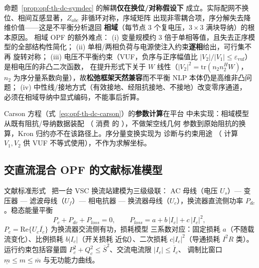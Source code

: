 \begin{remark}\label{rem:opf-th-dc-unbalanced}
命题~\ref{prop:opf-th-dc-symdec} 的解耦\textbf{仅在换位/对称假设下}
成立。实际配网不换位、相间互感显著，$Z_{abc}$ 非循环对称，序域矩阵
出现非零耦合项，序分解失去降维价值——这是不平衡分析退回
\textbf{相域}（每节点 $3$ 个复电压，$3\times3$ 满块导纳）的根本原因。
相域 OPF 的额外难点：
(i) 变量规模约 $3$ 倍于单相等值，且失去正序模型的全部结构性简化；
(ii) 单相/两相负荷与电源使注入约束\textbf{逐相}给出，可行集不再
旋转对称；
(iii) 电压不平衡约束（VUF，负序与正序幅值比
$|V_2|/|V_1|\le\varepsilon_{\mathrm{vuf}}$）是相电压的非凸二次函数，
在提升形式下关于 $W$ 线性（$|V_2|^2=\mathrm{tr}(n_2n_2^{H}W)$，
$n_2$ 为序分量系数向量），故\textbf{松弛框架天然兼容}而不平衡 NLP
本体仍是高维非凸问题；
(iv) 中性线/接地方式（有效接地、经阻抗接地、不接地）改变零序通道，
必须在相域导纳中显式编码，不能事后折算。
\end{remark}

\begin{gapnote}
Carson 方程（式~\eqref{eq:opf-th-dc-carson}）的\textbf{参数计算}在平台
中未实现：相域模型从既有阻抗/导纳数据装配
（
消费  的 ），不做架空线几何
参数到原始阻抗的换算，Kron 归约亦不在该路径上。序分量变换实现为
诊断与约束用途
（
计算 $V_1,V_2$ 供 VUF 不等式使用），不作为求解坐标。
\end{gapnote}

\subsection{交直流混合 OPF 的文献标准模型}\label{sec:opf-th-dc-hybrid}

\begin{definition}\label{def:opf-th-dc-vsc}
文献标准形式~\cite{opfdc:beerten} 把一台 VSC 换流站建模为三级级联：
AC 母线（电压 $U_s$）— 变压器 — 滤波母线（$U_f$）— 相电抗器 —
换流器母线（$U_c$），换流器直流侧功率 $P_{dc}$。稳态能量平衡
\begin{equation}
P_c+P_{dc}+P_{loss}=0,\qquad
P_{loss}=a+b\,|I_c|+c\,|I_c|^2,
\label{eq:opf-th-dc-vscloss}
\end{equation}
$P_c=\mathrm{Re}\{U_c\overline{I_c}\}$ 为换流器交流侧有功，损耗模型
三系数对应：固定损耗 $a$（不随载流变化）、比例损耗 $b|I_c|$（开关损耗
近似）、二次损耗 $c|I_c|^2$（导通损耗 $I^2R$ 类）。运行约束包括容量圆
$P_c^2+Q_c^2\le\overline S^2$、交流电流限 $|I_c|\le\overline I_c$、
调制比窗口 $\underline m\le m\le\overline m$ 与无功能力曲线。
\end{definition}

